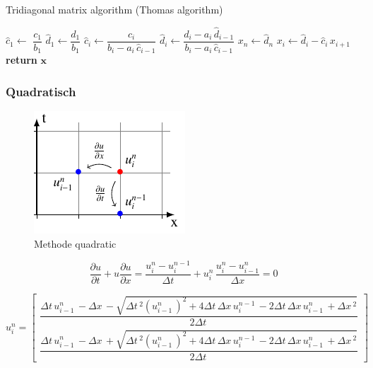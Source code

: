 \begin{algorithm}\caption{Tridiagonal matrix algorithm (Thomas algorithm)}\label{TDMA}
  \setlength{\lineskip}{7pt}
  \begin{algorithmic}[1]
      \State $\hat c_1 \gets$ $ \dfrac{c_1}{b_1}$
      \State $\hat d_1 \gets \dfrac{d_1}{b_1}$
        \State $\hat c_i \gets \dfrac{c_i}{b_i-a_i \, \hat c_{i-1}}$
        \State $\hat d_i \gets \dfrac{d_i - a_i \, \hat d_{i-1}}{b_i-a_i \, \hat c_{i-1}}$
      \EndFor
      \State $x_n \gets \hat d_n$
        \State $x_i \gets \hat d_i - \hat c_i \, x_{i+1}$
      \EndFor
      \State \textbf{return} $\textbf{x}$
    \EndFunction
  \end{algorithmic}
\end{algorithm}


\subsubsection{Quadratisch}
     \begin{figure}[!ht]
	\centering
	\includegraphics[height=.4\textwidth]{papers/burgers/BurgersEquation/tikz/quadratic/quadratic.pdf}
	\caption{Methode quadratic}
	\label{burgers:fig:quadratic}
\end{figure}

\begin{equation}
\frac {\partial u}{\partial t}+u{\frac {\partial u}{\partial x}} = \frac{u_{i}^{n}-u_{i}^{n-1}}{\Delta t}+ u_{i}^{n}\, \frac{u_{i}^{n}-u_{i-1}^{n}}{\Delta x}=0
\end{equation}

\begin{equation}
  u_{i}^{n} = \begin{bmatrix}
     \dfrac{\Delta{t}\, u^{n}_{i-1}\, - \Delta{x}\, - \sqrt{\Delta{t}\,^{2} \left(u^{n}_{i-1}\,\right)^{2} + 4 \Delta{t}\, \Delta{x}\, u^{n-1}_{i}\, - 2 \Delta{t}\, \Delta{x}\, u^{n}_{i-1}\, + \Delta{x}\,^{2}}}{2 \Delta{t}\,} \\[15pt]
     \dfrac{\Delta{t}\, u^{n}_{i-1}\, - \Delta{x}\, + \sqrt{\Delta{t}\,^{2} \left(u^{n}_{i-1}\,\right)^{2} + 4 \Delta{t}\, \Delta{x}\, u^{n-1}_{i}\, - 2 \Delta{t}\, \Delta{x}\, u^{n}_{i-1}\, + \Delta{x}\,^{2}}}{2 \Delta{t}\,}
  \end{bmatrix}
\end{equation}

